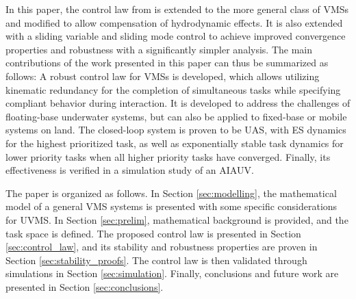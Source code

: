 \documentclass[../main.tex]{subfiles}
\begin{document}
In this paper, the control law from \cite{dietrich2020} is extended to the more general class of VMSs and modified to allow compensation of hydrodynamic effects. It is also extended with a sliding variable and sliding mode control to achieve improved convergence properties and robustness with a significantly simpler analysis. The main contributions of the work presented in this paper can thus be summarized as follows: A robust control law for VMSs is developed, which allows utilizing kinematic redundancy for the completion of simultaneous tasks while specifying compliant behavior during interaction. It is developed to address the challenges of floating-base underwater systems, but can also be applied to fixed-base or mobile systems on land. The closed-loop system is proven to be UAS, with ES dynamics for the highest prioritized task, as well as exponentially stable task dynamics for lower priority tasks when all higher priority tasks have converged. Finally, its effectiveness is verified in a simulation study of an AIAUV.

The paper is organized as follows. In Section \ref{sec:modelling}, the mathematical model of a general VMS systems is presented with some specific considerations for UVMS. In Section \ref{sec:prelim}, mathematical background is provided, and the task space is defined. The proposed control law is presented in Section \ref{sec:control_law}, and its stability and robustness properties are proven in Section \ref{sec:stability_proofs}. The control law is then validated through simulations in Section \ref{sec:simulation}. Finally, conclusions and future work are presented in Section \ref{sec:conclusions}.
\end{document}

